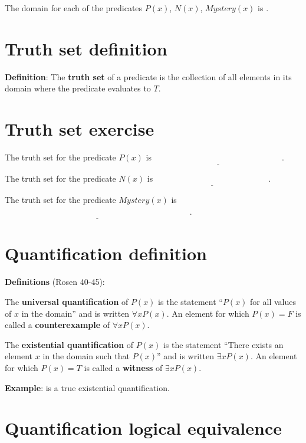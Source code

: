 \documentclass[12pt, oneside]{article}
\begin{document}
    The domain for each of the predicates $P(x)$, $N(x)$, $Mystery(x)$ is
    \underline{}. \vfill
\section*{Truth set definition}


{\bf Definition}: The {\bf truth  set} of a  predicate is the collection of all elements in its
domain where the predicate evaluates to $T$. \vfill
\section*{Truth set exercise}


The truth set for the predicate $P(x)$ is $\underline{\phantom{\{ x ~\mid~ P(x) = T\} = \{ 001, 010, 011 \}}}$.

The truth set for the predicate $N(x)$ is $\underline{\phantom{\{ x ~\mid~ N(x) = T\} = \{ 101, 111 \}}}$.

The truth set for the predicate $Mystery(x)$ is $\underline{\phantom{\{ x ~\mid~ Mystery(x) = T\} = \{ 000, 001, 010, 101, 111 \}}}$.


\vfill \vfill
\section*{Quantification definition}


{\bf Definitions} (Rosen 40-45): 

\vspace{-15pt}

The {\bf universal quantification} of $P(x)$ is the statement ``$P(x)$ for all values of $x$ in the domain''
and is written $\forall x P(x)$. An element for which $P(x) = F$ is called a {\bf counterexample} of $\forall x P(x)$.

The {\bf existential quantification} of $P(x)$ is the statement ``There exists an element $x$ in the domain such that $P(x)$'' and is written $\exists x P(x)$. An element for which $P(x) = T$ is called a {\bf witness} of $\exists x P(x)$.

{\bf Example}: 
\underline{\phantom{$\exists x ~(P(x) \to N(x))$}} is a true existential quantification. \vfill
\section*{Quantification logical equivalence}
\end{document}
